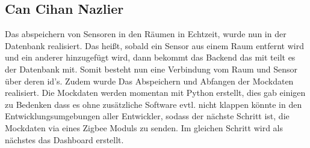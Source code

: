 \documentclass[]{article}
\begin{document}
\subsection{Can Cihan Nazlier}
Das abspeichern von Sensoren in den Räumen in Echtzeit, wurde nun in der Datenbank realisiert. Das heißt, sobald ein Sensor aus einem Raum entfernt wird und ein anderer hinzugefügt wird,
dann bekommt das Backend das mit teilt es der Datenbank mit. Somit besteht nun eine Verbindung vom Raum und Sensor über deren id's. Zudem wurde Das Abspeichern und Abfangen der Mockdaten realisiert.
Die Mockdaten werden momentan mit Python erstellt, dies gab einigen zu Bedenken dass es ohne zusätzliche Software evtl. nicht klappen könnte in den Entwicklungsumgebungen
aller Entwickler, sodass der nächste Schritt ist, die Mockdaten via eines Zigbee Moduls zu senden. Im gleichen Schritt wird als nächstes das Dashboard erstellt.

\printbibliography
\end{document}

